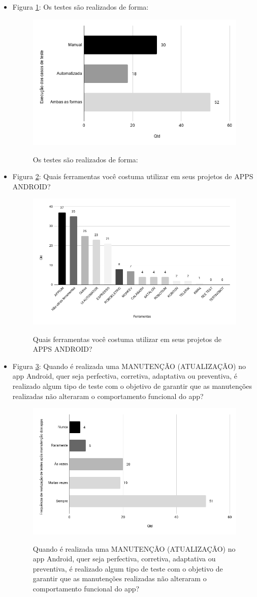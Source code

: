 \begin{itemize}
    
     \item Figura \ref{figure:s_formatestes}: Os testes são realizados de forma:
    \begin{figure}[!htb]
    \centering
    \includegraphics[width=.55\textwidth]{images/s_formatestes.png}
    \label{figure:s_formatestes}
    \caption{Os testes são realizados de forma:}
    \end{figure}    
    
    
    \item Figura \ref{figure:s_ferramentastestes}: Quais ferramentas você costuma utilizar em seus projetos de APPS ANDROID?
    \begin{figure}[!htb]
    \centering
    \includegraphics[width=.55\textwidth]{images/s_ferramentastestes.png}
    \label{figure:s_ferramentastestes}
    \caption{Quais ferramentas você costuma utilizar em seus projetos de APPS ANDROID?}
    \end{figure}
    
    
    \item Figura \ref{figure:s_testemanutencao}: Quando é realizada uma MANUTENÇÃO (ATUALIZAÇÃO) no app Android, quer seja perfectiva, corretiva, adaptativa ou preventiva, é realizado algum tipo de teste com o objetivo de garantir que as manutenções realizadas não alteraram o comportamento funcional do app?
    \begin{figure}[!htb]
    \centering
    \includegraphics[width=.55\textwidth]{images/s_testemanutencao.png}
    \label{figure:s_testemanutencao}
    \caption{Quando é realizada uma MANUTENÇÃO (ATUALIZAÇÃO) no app Android, quer seja perfectiva, corretiva, adaptativa ou preventiva, é realizado algum tipo de teste com o objetivo de garantir que as manutenções realizadas não alteraram o comportamento funcional do app?}
    \end{figure}   
    

\end{itemize}
